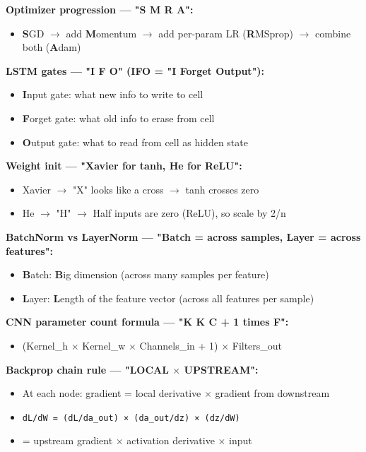 \documentclass[11pt]{article}
\providecommand{\tightlist}{\setlength{\itemsep}{1pt}\setlength{\parskip}{0pt}}
\begin{document}
\textbf{Optimizer progression --- "S M R A":}

\begin{itemize}
\tightlist
\item
  \textbf{S}GD \(\rightarrow\) add \textbf{M}omentum \(\rightarrow\) add per-param LR (\textbf{R}MSprop) \(\rightarrow\) combine both (\textbf{A}dam)
\end{itemize}

\textbf{LSTM gates --- "I F O" (IFO = "I Forget Output"):}

\begin{itemize}
\tightlist
\item
  \textbf{I}nput gate: what new info to write to cell
\item
  \textbf{F}orget gate: what old info to erase from cell
\item
  \textbf{O}utput gate: what to read from cell as hidden state
\end{itemize}

\textbf{Weight init --- "Xavier for tanh, He for ReLU":}

\begin{itemize}
\tightlist
\item
  Xavier \(\rightarrow\) "X" looks like a cross \(\rightarrow\) tanh crosses zero
\item
  He \(\rightarrow\) "H" \(\rightarrow\) Half inputs are zero (ReLU), so scale by 2/n
\end{itemize}

\textbf{BatchNorm vs LayerNorm --- "Batch = across samples, Layer = across features":}

\begin{itemize}
\tightlist
\item
  \textbf{B}atch: \textbf{B}ig dimension (across many samples per feature)
\item
  \textbf{L}ayer: \textbf{L}ength of the feature vector (across all features per sample)
\end{itemize}

\textbf{CNN parameter count formula --- "K K C + 1 times F":}

\begin{itemize}
\tightlist
\item
  (Kernel\_h \(\times\) Kernel\_w \(\times\) Channels\_in + 1) \(\times\) Filters\_out
\end{itemize}

\textbf{Backprop chain rule --- "LOCAL \(\times\) UPSTREAM":}

\begin{itemize}
\tightlist
\item
  At each node: gradient = local derivative \(\times\) gradient from downstream
\item
  \texttt{dL/dW\ =\ (dL/da\_out)\ ×\ (da\_out/dz)\ ×\ (dz/dW)}
\item
  = upstream gradient \(\times\) activation derivative \(\times\) input
\end{itemize}
\end{document}

